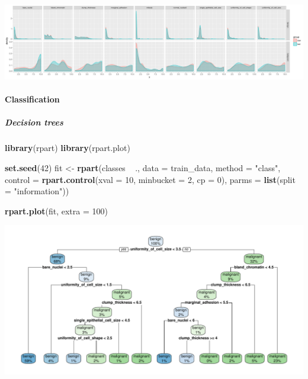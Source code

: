 \documentclass[]{article}
\newenvironment{Shaded}{\begin{snugshade}}{\end{snugshade}}
\newcommand{\KeywordTok}[1]{\textcolor[rgb]{0.13,0.29,0.53}{\textbf{{#1}}}}
\newcommand{\DataTypeTok}[1]{\textcolor[rgb]{0.13,0.29,0.53}{{#1}}}
\newcommand{\DecValTok}[1]{\textcolor[rgb]{0.00,0.00,0.81}{{#1}}}
\newcommand{\StringTok}[1]{\textcolor[rgb]{0.31,0.60,0.02}{{#1}}}
\newcommand{\NormalTok}[1]{{#1}}
\let\oldparagraph\paragraph
\renewcommand{\paragraph}[1]{\oldparagraph{#1}\mbox{}}
\let\oldsubparagraph\subparagraph
\renewcommand{\subparagraph}[1]{\oldsubparagraph{#1}\mbox{}}
\begin{document}
\begin{center}\includegraphics{webinar_code_files/figure-latex/unnamed-chunk-6-1} \end{center}

\paragraph{Classification}\label{classification}

\subparagraph{Decision trees}\label{decision-trees}

\begin{Shaded}
\begin{Highlighting}[]
\KeywordTok{library}\NormalTok{(rpart)}
\KeywordTok{library}\NormalTok{(rpart.plot)}

\KeywordTok{set.seed}\NormalTok{(}\DecValTok{42}\NormalTok{)}
\NormalTok{fit <-}\StringTok{ }\KeywordTok{rpart}\NormalTok{(classes ~}\StringTok{ }\NormalTok{.,}
            \DataTypeTok{data =} \NormalTok{train_data,}
            \DataTypeTok{method =} \StringTok{"class"}\NormalTok{,}
            \DataTypeTok{control =} \KeywordTok{rpart.control}\NormalTok{(}\DataTypeTok{xval =} \DecValTok{10}\NormalTok{, }
                                    \DataTypeTok{minbucket =} \DecValTok{2}\NormalTok{, }
                                    \DataTypeTok{cp =} \DecValTok{0}\NormalTok{), }
             \DataTypeTok{parms =} \KeywordTok{list}\NormalTok{(}\DataTypeTok{split =} \StringTok{"information"}\NormalTok{))}

\KeywordTok{rpart.plot}\NormalTok{(fit, }\DataTypeTok{extra =} \DecValTok{100}\NormalTok{)}
\end{Highlighting}
\end{Shaded}

\begin{center}\includegraphics{webinar_code_files/figure-latex/unnamed-chunk-7-1} \end{center}
\end{document}
